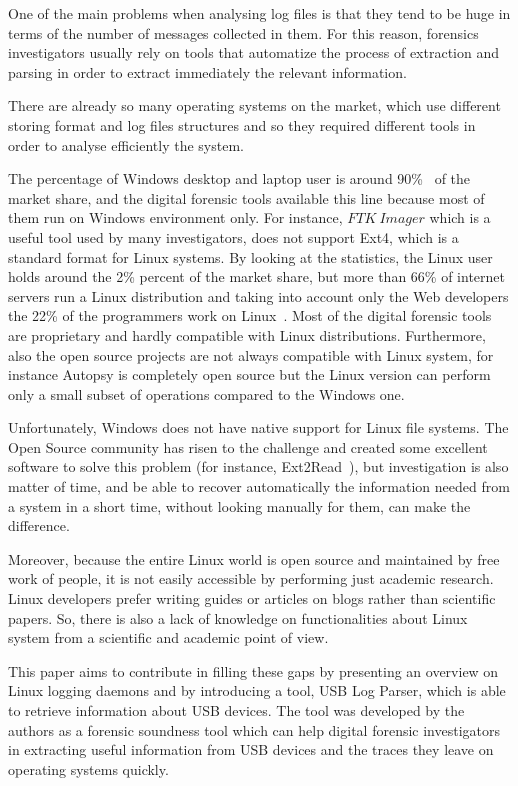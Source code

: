 \documentclass[a4paper]{article}
\begin{document}
One of the main problems when analysing log files is that they tend to be huge
in terms of the number of messages collected in them. For this reason, forensics
investigators usually rely on tools that automatize the process of extraction
and parsing in order to extract immediately the relevant information.

There are already so many operating systems on the market, which use different
storing format and log files structures and so they required different tools in
order to analyse efficiently the system.

The percentage of Windows desktop and laptop user is around 90\%~\cite{usagePC}
of the market share, and the digital forensic tools available this line because
most of them run on Windows environment only. For instance, $FTK~Imager$ which
is a useful tool used by many investigators, does not support Ext4, which is a
standard format for Linux systems. By looking at the statistics, the Linux user
holds around the 2\% percent of the market share, but more than 66\% of internet
servers run a Linux distribution and taking into account only the Web developers
the 22\% of the programmers work on Linux~\cite{usagePC}. Most of the digital
forensic tools are proprietary and hardly compatible with Linux distributions.
Furthermore, also the open source projects are not always compatible with Linux
system, for instance Autopsy is completely open source but the Linux version can
perform only a small subset of operations compared to the Windows one.

Unfortunately, Windows does not have native support for Linux file systems. The
Open Source community has risen to the challenge and created some excellent
software to solve this problem (for instance, Ext2Read~\cite{ext2read}), but
investigation is also matter of time, and be able to recover automatically the
information needed from a system in a short time, without looking manually for
them, can make the difference.

Moreover, because the entire Linux world is open source and maintained by free
work of people, it is not easily accessible by performing just academic
research. Linux developers prefer writing guides or articles on blogs rather
than scientific papers. So, there is also a lack of knowledge on functionalities
about Linux system from a scientific and academic point of view.

This paper aims to contribute in filling these gaps by presenting an overview on
Linux logging daemons and by introducing a tool, USB Log Parser, which is able
to retrieve information about USB devices. The tool was developed by the authors
as a forensic soundness tool which can help digital forensic investigators in
extracting useful information from USB devices and the traces they leave on
operating systems quickly.
\end{document}
